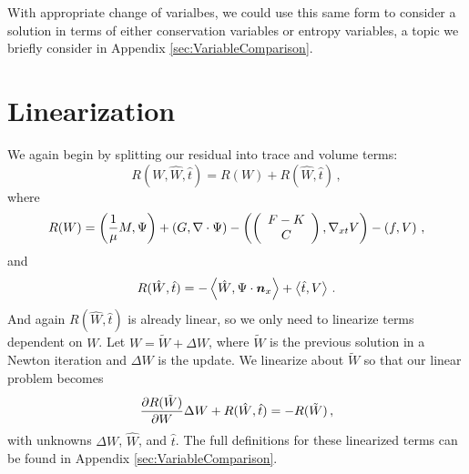 \documentclass[Dissertation.tex]{subfiles}
\begin{document}
With appropriate change of varialbes, we could use this same form to consider a solution in terms
of either conservation variables or entropy variables, 
a topic we briefly consider in Appendix \ref{sec:VariableComparison}.


\section{Linearization}
We again begin by splitting our residual into trace and volume terms:
\[
R(W,\hat W,\hat t) = R(W) + R(\hat W,\hat t)\,,
\]
where
\[
R(W)=
\left( \frac{1}{\mu}M,\Psi \right)+\left( G,\nabla\cdot\Psi \right)
-\left( \left( \begin{array}{c} F-K\\ C\\ \end{array} \right),\nabla_{xt} V \right)-\left( f,V \right)\,,
\]
and
\[
R(\hat W,\hat t)=
-\left\langle \hat W,\Psi\cdot\boldsymbol n_x \right\rangle
+\left\langle \hat t,V \right\rangle\,.
\]
And again $R(\hat W,\hat t)$ is already linear, so we only need to linearize terms dependent on $W$.
Let $W=\tilde W+\Delta W$, where $\tilde W$ is the previous solution in a Newton iteration and 
$\Delta W$ is the update. We linearize about $\tilde W$ so that our linear problem becomes
\[
\frac{\partial R(\tilde W)}{\partial W}\Delta W+R(\hat W,\hat t)=-R(\tilde W)\,,
\]
with unknowns $\Delta W$, $\hat W$, and $\hat t$.
The full definitions for these linearized terms can be found in Appendix \ref{sec:VariableComparison}.
\end{document}
